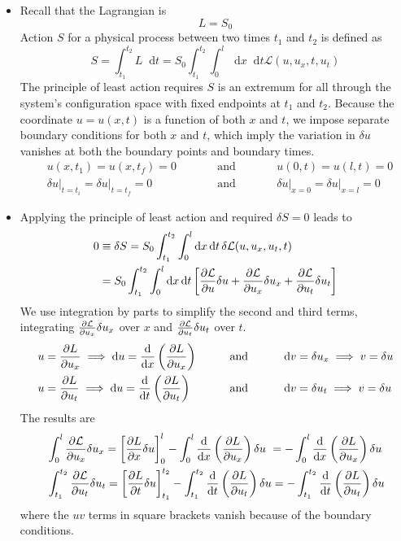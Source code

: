 \documentclass[11pt, a4paper]{article}
\newcommand{\eqtext}[1]{\qquad \text{#1} \qquad}
\newcommand{\diff}{\mathop{}\!\mathrm{d}} %
\begin{document}
\begin{itemize}	
	\item Recall that the Lagrangian is
	\begin{equation*}
		L = S_{0}
	\end{equation*}
	Action $ S $ for a physical process between two times $ t_{1} $ and $ t_{2} $ is defined as
	\begin{equation*}
		S = \int_{t_{1}}^{t_{2}} L \diff t = S_{0}\int_{t_{1}}^{t_{2}} \int_{0}^{l} \diff x \diff t \mathcal{L}(u, u_{x}, t, u_{t}) 
	\end{equation*}
	The principle of least action requires $ S $ is an extremum for all through the system's configuration space with fixed endpoints at $ t_{1} $ and $ t_{2} $. Because the coordinate $ u = u(x, t) $ is a function of both $ x $ and $ t $, we impose separate boundary conditions for both $ x $ and $ t $, which imply the variation in $ \delta u $ vanishes at both the boundary points and boundary times.
	\begin{align*}
		&u(x, t_{1}) = u(x, t_{f}) = 0  &&\eqtext{and} && u(0, t) = u(l, t) = 0\\
		&\delta u \big |_{t=t_{i}} = \delta u \big |_{t=t_{f}} = 0 &&\eqtext{and} && \delta u \big |_{x=0} = \delta u \big |_{x=l} = 0
	\end{align*}
	
	\item Applying the principle of least action and required $ \delta S = 0 $ leads to
	\begin{align*}
		0 &\equiv \delta S = S_{0}\int_{t_{1}}^{t_{2}} \int_{0}^{l} \diff x \diff t \, \delta \mathcal{L}(u, u_{x}, u_{t}, t) \\
		&=S_{0}\int_{t_{1}}^{t_{2}} \int_{0}^{l} \diff x \diff t \left[\pdv{\mathcal{L}}{u} \delta u + \pdv{\mathcal{L}}{u_{x}}\delta u_{x} + \pdv{\mathcal{L}}{u_{t}}\delta u_{t}\right]
	\end{align*}
	We use integration by parts to simplify the second and third terms, integrating $ \pdv{\mathcal{L}}{u_{x}}\delta u_{x} $ over $ x $ and $ \pdv{\mathcal{L}}{u_{t}}\delta u_{t} $ over $ t $.
	\begin{align*}
		&u = \pdv{L}{u_{x}} \implies \diff u = \dv{}{x} \left(\pdv{L}{u_{x}}\right) &&\eqtext{and}&& \diff v = \delta u_{x} \implies v = \delta u\\
		&u = \pdv{L}{u_{t}} \implies \diff u = \dv{}{t} \left(\pdv{L}{u_{t}}\right) &&\eqtext{and}&& \diff v = \delta u_{t} \implies v = \delta u
	\end{align*}
	The results are
	\begin{align*}
		&\int_{0}^{l} \pdv{\mathcal{L}}{u_{x}}\delta u_{x} = \left[\pdv{L}{x}\delta u \right]_{0}^{l} - \int_{0}^{l} \dv{}{x} \left(\pdv{L}{u_{x}}\right) \delta u \ = - \int_{0}^{l} \dv{}{x} \left(\pdv{L}{u_{x}}\right) \delta u \\
		&\int_{t_{1}}^{t_{2}} \pdv{\mathcal{L}}{u_{t}}\delta u_{t} = \left[\pdv{L}{t}\delta u \right]_{t_{1}}^{t_{2}} - \int_{t_{1}}^{t_{2}} \dv{}{t} \left(\pdv{L}{u_{t}}\right) \delta u = - \int_{t_{1}}^{t_{2}} \dv{}{t} \left(\pdv{L}{u_{t}}\right) \delta u 
	\end{align*}
	where the $ u v $ terms in square brackets vanish because of the boundary conditions.
	

\end{itemize}
\end{document}
